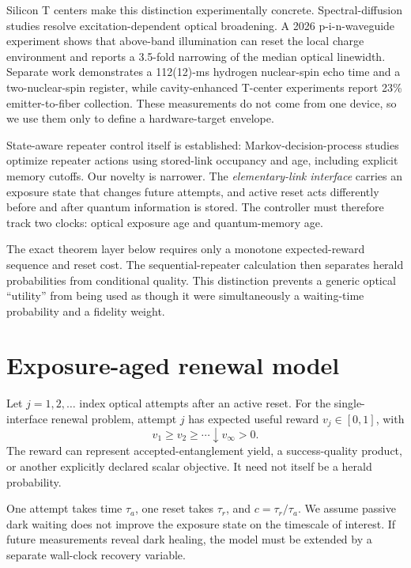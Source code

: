 \documentclass[aps,prx,reprint,superscriptaddress,nofootinbib,longbibliography,floatfix]{revtex4-2}
\begin{document}
Silicon T centers make this distinction experimentally concrete. Spectral-diffusion studies resolve excitation-dependent optical broadening. A 2026 p-i-n-waveguide experiment shows that above-band illumination can reset the local charge environment and reports a 3.5-fold narrowing of the median optical linewidth. Separate work demonstrates a 112(12)-ms hydrogen nuclear-spin echo time and a two-nuclear-spin register, while cavity-enhanced T-center experiments report 23\% emitter-to-fiber collection. These measurements do not come from one device, so we use them only to define a hardware-target envelope.

State-aware repeater control itself is established: Markov-decision-process studies optimize repeater actions using stored-link occupancy and age, including explicit memory cutoffs. Our novelty is narrower. The \emph{elementary-link interface} carries an exposure state that changes future attempts, and active reset acts differently before and after quantum information is stored. The controller must therefore track two clocks: optical exposure age and quantum-memory age.

The exact theorem layer below requires only a monotone expected-reward sequence and reset cost. The sequential-repeater calculation then separates herald probabilities from conditional quality. This distinction prevents a generic optical ``utility'' from being used as though it were simultaneously a waiting-time probability and a fidelity weight.

\section{Exposure-aged renewal model}
Let $j=1,2,\ldots$ index optical attempts after an active reset. For the single-interface renewal problem, attempt $j$ has expected useful reward $v_j\in[0,1]$, with
\begin{equation}
v_1\ge v_2\ge\cdots\downarrow v_\infty>0.
\end{equation}
The reward can represent accepted-entanglement yield, a success-quality product, or another explicitly declared scalar objective. It need not itself be a herald probability.

One attempt takes time $\tau_a$, one reset takes $\tau_r$, and $c=\tau_r/\tau_a$. We assume passive dark waiting does not improve the exposure state on the timescale of interest. If future measurements reveal dark healing, the model must be extended by a separate wall-clock recovery variable.
\end{document}
